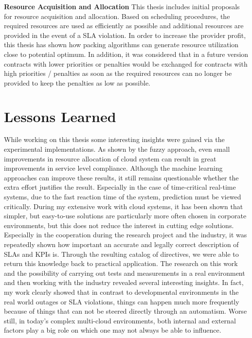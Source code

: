 \textbf{Resource Acquisition and Allocation} 
This thesis includes initial proposals for resource acquisition and allocation. Based on scheduling procedures, the required resources are used as efficiently as possible and additional resources are provided in the event of a SLA violation. In order to increase the provider profit, this thesis has shown how packing algorithms can generate resource utilization close to potential optimum. In addition, it was considered that in a future version contracts with lower priorities or penalties would be exchanged for contracts with high priorities / penalties as soon as the required resources can no longer be provided to keep the penalties as low as possible.


\section{Lessons Learned}
While working on this thesis some interesting insights were gained via the experimental implementations. As shown by the fuzzy approach, even small improvements in resource allocation of cloud system can result in great improvements in service level compliance. Although the machine learning approaches can improve these results, it still remains questionable whether the extra effort justifies the result. Especially in the case of time-critical real-time systems, due to the fast reaction time of the system, prediction must be viewed critically. During my extensive work with cloud systems, it has been shown that simpler, but easy-to-use solutions are particularly more often chosen in corporate environments, but this does not reduce the interest in cutting edge solutions. Especially in the cooperation during the research project and the industry, it was repeatedly shown how important an accurate and legally correct description of SLAs and KPIs is. Through the resulting catalog of directives, we were able to return this knowledge back to practical application. The research on this work and the possibility of carrying out tests and measurements in a real environment and then working with the industry revealed several interesting insights. In fact, my work clearly showed that in contrast to developmental environments in the real world outages or SLA violations, things can happen much more frequently because of things that can not be steered directly through an automatism. Worse still, in today's complex multi-cloud environments, both internal and external factors play a big role on which one may not always be able to influence.


